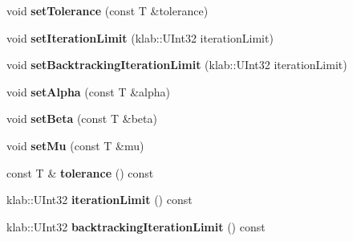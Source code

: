 \begin{DoxyCompactItemize}
\item 
void {\bfseries set\+Tolerance} (const T \&tolerance)\hypertarget{classkl1p_1_1TBasisPursuitSolver_ab4471d1e86105f65aa92bf2405a6b9ad}{}\label{classkl1p_1_1TBasisPursuitSolver_ab4471d1e86105f65aa92bf2405a6b9ad}

\item 
void {\bfseries set\+Iteration\+Limit} (klab\+::\+U\+Int32 iteration\+Limit)\hypertarget{classkl1p_1_1TBasisPursuitSolver_aad318a17bc437dd2c0e71edd15193114}{}\label{classkl1p_1_1TBasisPursuitSolver_aad318a17bc437dd2c0e71edd15193114}

\item 
void {\bfseries set\+Backtracking\+Iteration\+Limit} (klab\+::\+U\+Int32 iteration\+Limit)\hypertarget{classkl1p_1_1TBasisPursuitSolver_a572ea61db1a0111021560b1e40055377}{}\label{classkl1p_1_1TBasisPursuitSolver_a572ea61db1a0111021560b1e40055377}

\item 
void {\bfseries set\+Alpha} (const T \&alpha)\hypertarget{classkl1p_1_1TBasisPursuitSolver_add5e955f35c3de94bf8a1cafe96c6cb7}{}\label{classkl1p_1_1TBasisPursuitSolver_add5e955f35c3de94bf8a1cafe96c6cb7}

\item 
void {\bfseries set\+Beta} (const T \&beta)\hypertarget{classkl1p_1_1TBasisPursuitSolver_aef8f810999b29096c966715b3531963c}{}\label{classkl1p_1_1TBasisPursuitSolver_aef8f810999b29096c966715b3531963c}

\item 
void {\bfseries set\+Mu} (const T \&mu)\hypertarget{classkl1p_1_1TBasisPursuitSolver_a4079b0c20309a5253e047eaf1c40d189}{}\label{classkl1p_1_1TBasisPursuitSolver_a4079b0c20309a5253e047eaf1c40d189}

\item 
const T \& {\bfseries tolerance} () const \hypertarget{classkl1p_1_1TBasisPursuitSolver_ad015cf6bcfae17dd6367e85bea99a359}{}\label{classkl1p_1_1TBasisPursuitSolver_ad015cf6bcfae17dd6367e85bea99a359}

\item 
klab\+::\+U\+Int32 {\bfseries iteration\+Limit} () const \hypertarget{classkl1p_1_1TBasisPursuitSolver_ad1f36fa34392dd4b11ab75e32ccc756f}{}\label{classkl1p_1_1TBasisPursuitSolver_ad1f36fa34392dd4b11ab75e32ccc756f}

\item 
klab\+::\+U\+Int32 {\bfseries backtracking\+Iteration\+Limit} () const \hypertarget{classkl1p_1_1TBasisPursuitSolver_a706f7502e62afedac139a4ba3347db87}{}\label{classkl1p_1_1TBasisPursuitSolver_a706f7502e62afedac139a4ba3347db87}


\end{DoxyCompactItemize}
